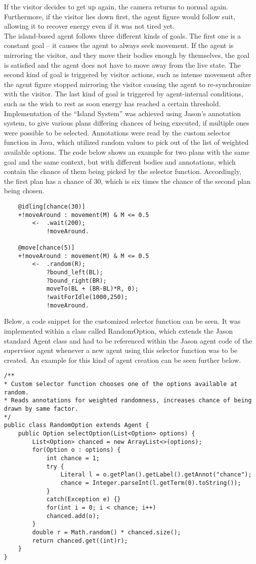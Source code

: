\documentclass[draft,final]{vutinfth} %
\begin{document}
If the visitor decides to get up again, the camera returns to normal again. 
Furthermore, if the visitor lies down first, the agent figure would follow suit, allowing it to recover energy even if it was not tired yet.\\
The island-based agent follows three different kinds of goals. 
The first one is a constant goal – it causes the agent to always seek movement. 
If the agent is mirroring the visitor, and they move their bodies enough by themselves, the goal is satisfied and the agent does not have to move away from the live state. 
The second kind of goal is triggered by visitor actions, such as intense movement after the agent figure stopped mirroring the visitor causing the agent to re-synchronize with the visitor. 
The last kind of goal is triggered by agent-internal conditions, such as the wish to rest as soon energy has reached a certain threshold. \\
Implementation of the “Island System” was achieved using Jason’s annotation system, to give various plans differing chances of being executed, if multiple ones were possible to be selected.
Annotations were read by the custom selector function in Java, which utilized random values to pick out of the list of weighted available options. 
The code below shows an example for two plans with the same goal and the same context, but with different bodies and annotations, which contain the chance of them being picked by the selector function. 
Accordingly, the first plan has a chance of 30, which is six times the chance of the second plan being chosen.
\begin{verbatim}
    @idling[chance(30)]	
    +!moveAround : movement(M) & M <= 0.5
        <-  .wait(200);	
            !moveAround.

    @move[chance(5)]
    +!moveAround : movement(M) & M <= 0.5
        <-  .random(R);	
            ?bound_left(BL);
            ?bound_right(BR);
            moveTo(BL + (BR-BL)*R, 0);
            !waitForIdle(1000,250);	
            !moveAround.
\end{verbatim}
Below, a code snippet for the customized selector function can be seen. It was implemented within a class called RandomOption, which extends the Jason standard Agent class and had to be referenced within the Jason agent code of the supervisor agent whenever a new agent using this selector function was to be created. 
An example for this kind of agent creation can be seen further below.
\begin{lstlisting}
/**
* Custom selector function chooses one of the options available at random.
* Reads annotations for weighted randomness, increases chance of being drawn by same factor.
*/
public class RandomOption extends Agent {
	public Option selectOption(List<Option> options) {
		List<Option> chanced = new ArrayList<>(options);
		for(Option o : options) {
			int chance = 1;
			try {
				Literal l = o.getPlan().getLabel().getAnnot("chance");
				chance = Integer.parseInt(l.getTerm(0).toString());
			}
			catch(Exception e) {}
			for(int i = 0; i < chance; i++)
			chanced.add(o);
		}
		double r = Math.random() * chanced.size();
		return chanced.get((int)r);
	}
}
\end{lstlisting}
\end{document}
